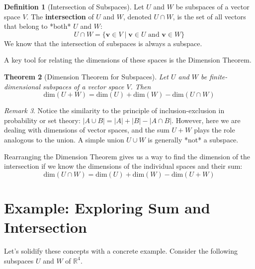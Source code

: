 \documentclass[11pt]{article}
\newtheorem{theorem}{Theorem}[section]
\theoremstyle{definition}
\newtheorem{definition}[theorem]{Definition}
\theoremstyle{remark}
\newtheorem{remark}[theorem]{Remark}
\newcommand{\R}{\mathbb{R}}
\newcommand{\vsdim}{\text{dim}}
\newcommand{\vecv}{\mathbf{v}}
\begin{document}
\begin{definition}[Intersection of Subspaces]
Let $U$ and $W$ be subspaces of a vector space $V$. The \textbf{intersection} of $U$ and $W$, denoted $U \cap W$, is the set of all vectors that belong to *both* $U$ and $W$:
\[ U \cap W = \{ \vecv \in V \mid \vecv \in U \text{ and } \vecv \in W \} \]
We know that the intersection of subspaces is always a subspace.
\end{definition}

A key tool for relating the dimensions of these spaces is the Dimension Theorem.

\begin{theorem}[Dimension Theorem for Subspaces]
Let $U$ and $W$ be finite-dimensional subspaces of a vector space $V$. Then
\[ \vsdim(U+W) = \vsdim(U) + \vsdim(W) - \vsdim(U \cap W) \]
\end{theorem}

\begin{remark}
Notice the similarity to the principle of inclusion-exclusion in probability or set theory: $|A \cup B| = |A| + |B| - |A \cap B|$. However, here we are dealing with dimensions of vector spaces, and the sum $U+W$ plays the role analogous to the union. A simple union $U \cup W$ is generally *not* a subspace.
\end{remark}

Rearranging the Dimension Theorem gives us a way to find the dimension of the intersection if we know the dimensions of the individual spaces and their sum:
\[ \vsdim(U \cap W) = \vsdim(U) + \vsdim(W) - \vsdim(U+W) \]

\section{Example: Exploring Sum and Intersection}

Let's solidify these concepts with a concrete example. Consider the following subspaces $U$ and $W$ of $\R^4$.
\end{document}
